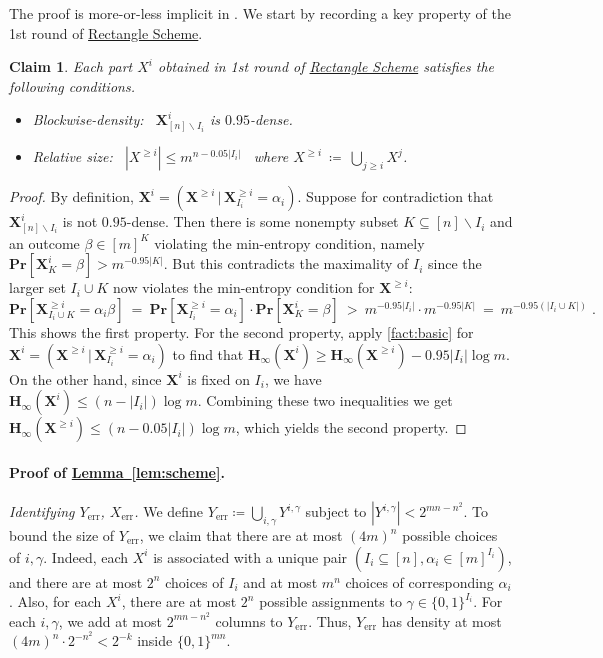 \documentclass[11pt]{article}
\numberwithin{equation}{section}
\newtheorem{claim}[theorem]{Claim}
\theoremstyle{definition}
\theoremstyle{plain}
\newcommand{\expref}[2]{\hyperref[#2]{#1~\ref{#2}}}
\newcommand{\rectlemma}{\expref{Lemma}{lem:scheme}\xspace}%
\newcommand{\rectscheme}{\hyperref[alg:partition]{Rectangle Scheme}\xspace}
\renewcommand{\Pr}{\mathbf{Pr}}
\newcommand{\Hmin}{\mathbf{H}_\infty}
\DeclareMathOperator{\err}{err}
\newcommand{\X}{\bm{X}}
\newcommand{\allY}{\{0,1\}^{mn}}
\newcommand{\bit}{\{0,1\}}
\begin{document}
The proof is more-or-less implicit in \cite{goos16rectangles,goos17bpp}. We start by recording a key property of the 1st round of \rectscheme.

\begin{claim}\label{clm:density-restoring}
Each part $X^i$ obtained in 1st round of \rectscheme
%
satisfies the following conditions.  %
\begin{itemize}
\item \emph{Blockwise-density:}~ $\X^i_{[n] \smallsetminus I_i}$ is $0.95$-dense.
\item \emph{Relative size:}~ $|X^{\geqslant i}| \le m^{n - 0.05 |I_i|}$~ where $X^{\geqslant i} ~\coloneqq~ \bigcup_{j \ge i} X^j$.
\end{itemize}
\end{claim}
\begin{proof}
By definition, $\X^i = (\X^{\geqslant i}\, |\, \X^{\geqslant i}_{I_i} = \alpha_i)$. Suppose for contradiction that $\X^i_{[n] \smallsetminus I_i}$ is not $0.95$-dense. Then there is some nonempty subset $K \subseteq [n] \smallsetminus I_i$ and an outcome $\beta \in [m]^K$ violating the min-entropy condition, namely $\Pr[\X^i_K = \beta] > m^{-0.95 |K|}$. But this contradicts the maximality of $I_i$ since the larger set $I_i \cup K$ now violates the min-entropy condition for $\X^{\geqslant i}$:
\[
\Pr[\X^{\geqslant i}_{I_i \cup K} = \alpha_i \beta] ~=~ \Pr[\X^{\geqslant i}_{I_i} = \alpha_i] \cdot \Pr[\X^{i}_K = \beta] ~>~ m^{-0.95 |I_i|} \cdot m^{-0.95 |K|} ~=~ m^{-0.95(|I_i \cup K|)}\;.
\]
This shows the first property. For the second property, apply \autoref{fact:basic} for $\X^i = (\X^{\geqslant i}\, |\, \X^{\geqslant i}_{I_i} = \alpha_i)$ to find that $\Hmin(\X^i) \geq \Hmin(\X^{\geqslant i}) - 0.95|I_i|\log m$. On the other hand, since $\X^i$ is fixed on $I_i$, we have $\Hmin(\X^i)\leq (n-|I_i|)\log m$. Combining these two inequalities we get $\Hmin(\X^{\geqslant i}) \leq (n-0.05|I_i|)\log m$, which yields the second property.
\end{proof}

\paragraph{Proof of \rectlemma.}
\emph{Identifying $Y_{\err}$, $X_{\err}$.}
We define $Y_{\err} \coloneqq \bigcup_{i,\gamma} Y^{i,\gamma}$ subject to $|Y^{i,\gamma}| < 2^{mn-n^2}$. To bound the size of $Y_{\err}$, we claim that there are at most $(4m)^n$ possible choices of $i, \gamma$. Indeed, each $X^i$ is associated with a unique pair $(I_i \subseteq [n], \alpha_i \in [m]^{I_i})$, and there are at most $2^n$ choices of $I_i$ and at most $m^n$ choices of corresponding $\alpha_i$. Also, for each $X^i$, there are at most $2^n$ possible assignments to $\gamma \in \bit^{I_i}$. For each $i, \gamma$, we add at most $2^{mn - n^2}$ columns to $Y_{\err}$. Thus, $Y_{\err}$ has density at most $(4m)^n \cdot 2^{- n^2} < 2^{-k}$ inside $\allY$.
	
\end{document}
